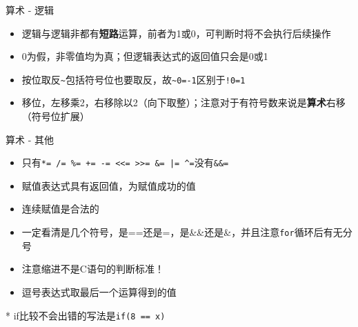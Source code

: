 \documentclass[UTF8]{ctexbeamer}
\begin{document}
\begin{frame}[fragile]{算术 - 逻辑}
\begin{itemize}[<+->]
	\item 逻辑与逻辑非都有\textbf{短路}运算，前者为1或0，可判断时将不会执行后续操作
	\item 0为假，非零值均为真；但逻辑表达式的返回值只会是0或1
	\item 按位取反\verb'~'包括符号位也要取反，故\verb'~0=-1'区别于\verb'!0=1'
	\item 移位，左移乘2，右移除以2（向下取整）；注意对于有符号数来说是\textbf{算术}右移（符号位扩展）
\end{itemize}
\end{frame}

\begin{frame}[fragile]{算术 - 其他}
\begin{itemize}[<+->]
	\item 只有\verb'*= /= %= += -= <<= >>= &= |= ^='没有\verb'&&='
	\item 赋值表达式具有返回值，为赋值成功的值
	\item 连续赋值是合法的
	\item 一定看清是几个符号，是==还是=，是\&\&还是\&，并且注意\verb'for'循环后有无分号
	\item 注意缩进不是C语句的判断标准！
	\item 逗号表达式取最后一个运算得到的值
\end{itemize}
\pause
* if比较不会出错的写法是\verb'if(8 == x)'
\end{frame}
\end{document}
